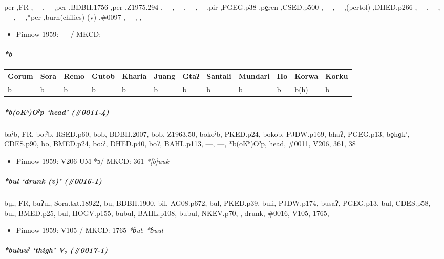 \documentclass[a4paper,]{article}
\providecommand{\tightlist}{%
  \setlength{\itemsep}{0pt}\setlength{\parskip}{0pt}}
\let\oldparagraph\paragraph
\renewcommand{\paragraph}[1]{\oldparagraph{#1}\mbox{}}
\let\oldsubparagraph\subparagraph
\renewcommand{\subparagraph}[1]{\oldsubparagraph{#1}\mbox{}}
\begin{document}
per ,FR ,--- ,--- ,per ,BDBH.1756 ,per ,Z1975.294 ,--- ,--- ,--- ,---
,pir ,PGEG.p38 ,pe̠ṛen ,CSED.p500 ,--- ,--- ,(pertol) ,DHED.p266 ,---
,--- ,--- ,--- ,*per ,burn(chilies) (v) ,\#0097 ,--- , ,

\begin{itemize}
\tightlist
\item
  Pinnow 1959: --- / MKCD: ---
\end{itemize}

\paragraph{\texorpdfstring{\emph{*b}}{*b}}\label{b}

\begin{longtable}[]{@{}llllllllllll@{}}
\toprule
Gorum & Sora & Remo & Gutob & Kharia & Juang & Gtaʔ & Santali & Mundari
& Ho & Korwa & Korku\tabularnewline
\midrule
\endhead
b & b & b & b & b & b & b & b & b & b & b(h) & b\tabularnewline
\bottomrule
\end{longtable}

\subparagraph{\texorpdfstring{\emph{*b(oKʰ)Oˀp} `head'
(\#0011-4)}{*b(oKʰ)Oˀp head (\#0011-4)}}\label{bokux2b0oux2c0p-head-0011-4-1}

baˀb, FR, bo:ˀb, RSED.p60, bob, BDBH.2007, bob, Z1963.50, bokoˀb,
PKED.p24, bokob, PJDW.p169, bhaʔ, PGEG.p13, bo̠ho̠k', CDES.p90, bo,
BMED.p24, bo:ʔ, DHED.p40, boʔ, BAHL.p113, ---, ---, *b(oKʰ)Oˀp, head,
\#0011, V206, 361, 38

\begin{itemize}
\tightlist
\item
  Pinnow 1959: V206 UM *ɔ/ MKCD: 361 \emph{*{[}b{]}uuk}
\end{itemize}

\subparagraph{\texorpdfstring{\emph{*bul} `drunk (v)'
(\#0016-1)}{*bul drunk (v) (\#0016-1)}}\label{bul-drunk-v-0016-1}

bṵl, FR, buʔul, Sora.txt.18922, bu, BDBH.1900, bil, AG08.p672, bul,
PKED.p39, buli, PJDW.p174, busaʔ, PGEG.p13, bul, CDES.p58, bul,
BMED.p25, bul, HOGV.p155, bubul, BAHL.p108, bubul, NKEV.p70, , drunk,
\#0016, V105, 1765,

\begin{itemize}
\tightlist
\item
  Pinnow 1959: V105 / MKCD: 1765 \emph{*ɓul}; \emph{*ɓuul}
\end{itemize}

\subparagraph{\texorpdfstring{\emph{*buluuˀ} `thigh' V₂
(\#0017-1)}{*buluuˀ thigh V₂ (\#0017-1)}}\label{buluuux2c0-thigh-v-0017-1}
\end{document}
